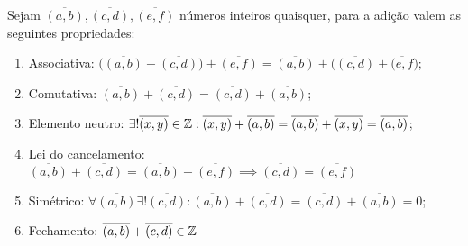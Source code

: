 \documentclass[../main.tex]{subfiles}
\begin{document}
\begin{prop}{Sejam $\overline{(a,b)}, \overline{(c,d)}, \overline{(e,f)}$ números inteiros quaisquer, para a adição valem as seguintes propriedades:}
    \begin{enumerate}[label=(\roman*)]
        \item Associativa: $\big(\overline{(a,b)} + \overline{(c,d)}\big) +  \overline{(e,f)} = \overline{(a,b)} + \big(\overline{(c,d)} +  \overline{(e,f}\big)$;
        
        \item Comutativa: $\overline{(a,b)} + \overline{(c,d)} =  \overline{(c,d)} + \overline{(a,b)}$;
        
        \item Elemento neutro: $\exists!\overline{(x,y)} \in \mathbb{Z} : \overline{(x,y)} + \overline{(a,b)} = \overline{(a,b)} + \overline{(x,y)} = \overline{(a,b)}$;
        
        \item Lei do cancelamento: $\overline{(a,b)} + \overline{(c,d)} = \overline{(a,b)} + \overline{(e,f)} \implies \overline{(c,d)} = \overline{(e,f)}$
        
        \item Simétrico: $\forall \overline{(a,b)} \exists!\overline{(c,d)} : \overline{(a,b)} + \overline{(c,d)} = \overline{(c,d)} + \overline{(a,b)}  = 0$;
        
        \item Fechamento: $\overline{(a,b)} + \overline{(c,d)} \in \mathbb{Z}$
    \end{enumerate}
\end{prop}
\end{document}

